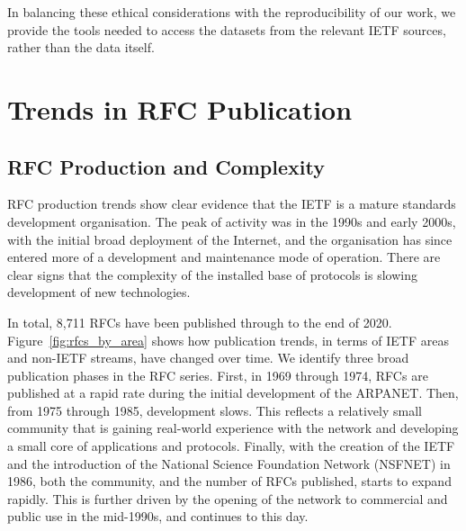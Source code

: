\documentclass[twocolumn,10pt]{article}
\newcommand{\pb}[1]{\vspace{0.75ex}\noindent{\textbf{#1}}}
\begin{document}
In balancing these ethical considerations with the reproducibility of our
work, we provide the tools needed to access the datasets from the relevant
IETF sources, rather than the data itself.


\section{Trends in RFC Publication}


\subsection{RFC Production and Complexity}

RFC production trends show clear evidence that the IETF is a mature
standards development organisation. The peak of activity was in the 1990s
and early 2000s, with the initial broad deployment of the Internet, and the
organisation has since entered more of a development and maintenance mode
of operation. There are clear signs that the complexity of the installed
base of protocols is slowing development of new technologies.


\pb{RFC Publication Rate:}
In total, 8,711 RFCs have been published through to the end of 2020.
Figure~\ref{fig:rfcs_by_area} shows how publication trends, in terms of
IETF areas and non-IETF streams, have changed over time. We identify three
broad publication phases in the RFC series. First, in 1969 through 1974,
RFCs are published at a rapid rate during the initial development of the
ARPANET. Then, from 1975 through 1985, development slows. This reflects a
relatively small community that is gaining real-world experience with the
network and developing a small core of applications and protocols. Finally,
with the creation of the IETF and the introduction of the National Science
Foundation Network (NSFNET) in 1986, both the community, and the number of
RFCs published, starts to expand rapidly. This is further driven by the
opening of the network to commercial and public use in the mid-1990s, and
continues to this day.
\end{document}
